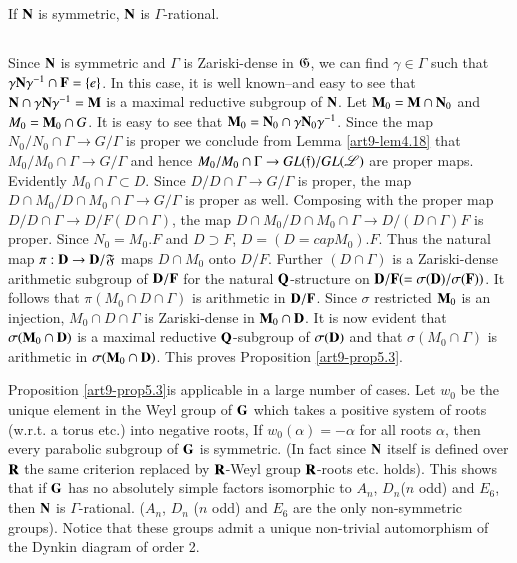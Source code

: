 \begin{proposition}\label{art9-prop5.3}
If $\mathbf{N}$ is symmetric, $\mathbf{N}$ is $\Gamma$-rational.
\end{proposition}

\setcounter{subsection}{3}
\subsection{}\label{art9-subsec5.4}
Since $\mathbf{N}$ is symmetric and $\Gamma$ is Zariski-dense in $\mathfrak{G}$, we can find $\gamma \in\Gamma$ such that $\gamma \mathbf{N} \gamma^{-1} \cap\mathbf{F} = \{e\}$. In this case, it is well known--and easy to see that $\mathbf{N} \cap \gamma \mathbf{N} \gamma^{-1} = \mathbf{M}$ is a maximal reductive subgroup of $\mathbf{N}$. Let $\mathbf{M}_0 = \mathbf{M} \cap \mathbf{N}_0$ and $M_0 = \mathbf{M}_0 \cap G$. It is easy to see that $\mathbf{M}_0 = \mathbf{N}_0 \cap \gamma \mathbf{N}_0 \gamma^{-1}$. Since the map $N_0/ N_0 \cap \Gamma\to G/ \Gamma $ is proper we conclude from Lemma \ref{art9-lem4.18} that $M_0 / M_0 \cap \Gamma \to G/\Gamma$ and hence $M_0 / M_0 \cap \Gamma \to G  L(\mathfrak{f}) / GL (\mathscr{L})$ are proper maps. Evidently $M_0 \cap \Gamma \subset D$. Since $D/ D \cap \Gamma \to G / \Gamma$ is proper, the map $D \cap M_0 / D \cap M_0 \cap \Gamma \to G / \Gamma$ is proper as well. Composing with the proper map $D/D \cap \Gamma \to D/ F (D \cap \Gamma)$, the map $D \cap M_0 / D \cap M_0 \cap \Gamma \to D / (D \cap \Gamma) F$ is proper. Since $N_0 = M_0 . F$ and $D \supset F$, $D = (D =cap M_0) . F$. Thus the natural map $\pi : \mathbf{D} \to \mathbf{D} / \mathfrak{F}$ maps $D \cap M_0$  onto $D/ F$. Further $(D \cap \Gamma)$ is a Zariski-dense arithmetic subgroup of $\mathbf{D}/\mathbf{F}$ for the natural $\mathbf{Q}$-structure on $\mathbf{D} / \mathbf{F} (= \sigma (\mathbf{D})/ \sigma (\mathbf{F}))$. It follows that $\pi (M_0 \cap D \cap \Gamma)$ is arithmetic in $\mathbf{D}/\mathbf{F}$. Since $\sigma$ restricted $\mathbf{M}_0$ is an injection, $M_0 \cap D \cap \Gamma$ is Zariski-dense in $\mathbf{M}_0 \cap \mathbf{D}$. It is now evident that $\sigma (\mathbf{M}_0 \cap \mathbf{D})$ is a maximal reductive $\mathbf{Q}$-subgroup of $\sigma (\mathbf{D})$ and that $\sigma (M_0 \cap \Gamma)$ is arithmetic in $\sigma (\mathbf{M}_0 \cap \mathbf{D})$. This proves Proposition \ref{art9-prop5.3}.

\setcounter{definition}{4}
\begin{remarks}\label{art9-remarks5.5}
Proposition \ref{art9-prop5.3}\pageoriginale is applicable in a large number of cases. Let $w_0$ be the unique element in the Weyl group of $\mathbf{G}$ which takes a positive system of roots (w.r.t. a torus etc.) into negative roots, If $w_0 (\alpha) = - \alpha$ for all roots $\alpha$, then every parabolic subgroup of $\mathbf{G}$ is symmetric. (In fact since $\mathbf{N}$ itself is defined over $\mathbf{R}$ the same criterion replaced by $\mathbf{R}$-Weyl group $\mathbf{R}$-roots etc. holds). This shows that if $\mathbf{G}$ has no absolutely simple factors isomorphic to $A_n$, $D_n$($n$ odd) and $E_6$, then $\mathbf{N}$ is $\Gamma$-rational. (\ie $A_n$, $D_n$ ($n$ odd) and $E_6$ are the only non-symmetric groups). Notice that these groups admit a unique non-trivial automorphism of the Dynkin diagram of order 2.
\end{remarks}

